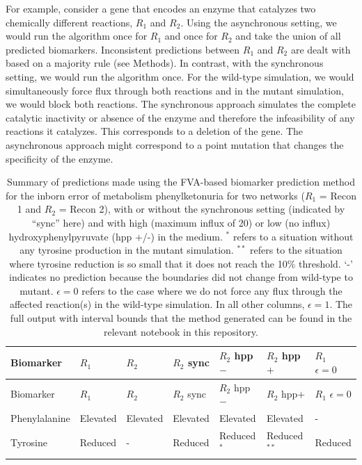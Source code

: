 \documentclass[10pt,a4paper,onecolumn]{article}
\begin{document}
For example, consider a gene that encodes an enzyme that catalyzes two
chemically different reactions, \(R_1\) and \(R_2\). Using the
asynchronous setting, we would run the algorithm once for \(R_1\) and
once for \(R_2\) and take the union of all predicted biomarkers.
Inconsistent predictions between \(R_1\) and \(R_2\) are dealt with
based on a majority rule (see Methods). In contrast, with the
synchronous setting, we would run the algorithm once. For the wild-type
simulation, we would simultaneously force flux through both reactions
and in the mutant simulation, we would block both reactions. The
synchronous approach simulates the complete catalytic inactivity or
absence of the enzyme and therefore the infeasibility of any reactions
it catalyzes. This corresponds to a deletion of the gene. The
asynchronous approach might correspond to a point mutation that changes
the specificity of the enzyme.

\hypertarget{tbl:PKU_results}{}
\begin{longtable}[]{@{}lllllll@{}}
\caption{\label{tbl:PKU_results}Summary of predictions made using the
FVA-based biomarker prediction method for the inborn error of metabolism
phenylketonuria for two networks (\(R_1\) = Recon 1 and \(R_2\) = Recon
2), with or without the synchronous setting (indicated by ``sync'' here)
and with high (maximum influx of 20) or low (no influx)
hydroxyphenylpyruvate (hpp +/-) in the medium. \(^*\) refers to a
situation without any tyrosine production in the mutant simulation.
\(^{**}\) refers to the situation where tyrosine reduction is so small
that it does not reach the 10\% threshold. `-' indicates no prediction
because the boundaries did not change from wild-type to mutant.
\(\epsilon = 0\) refers to the case where we do not force any flux
through the affected reaction(s) in the wild-type simulation. In all
other columns, \(\epsilon = 1\). The full output with interval bounds
that the method generated can be found in the relevant notebook in this
repository. }\tabularnewline
\toprule
Biomarker & \(R_1\) & \(R_2\) & \(R_2\) sync & \(R_2\) hpp\(-\) &
\(R_2\) hpp\(+\) & \(R_1\) \(\epsilon = 0\)\tabularnewline
\midrule
\endfirsthead
\toprule
Biomarker & \(R_1\) & \(R_2\) & \(R_2\) sync & \(R_2\) hpp\(-\) &
\(R_2\) hpp\(+\) & \(R_1\) \(\epsilon = 0\)\tabularnewline
\midrule
\endhead
Phenylalanine & Elevated & Elevated & Elevated & Elevated & Elevated &
-\tabularnewline
Tyrosine & Reduced & - & Reduced & Reduced\(^*\) & Reduced\(^{**}\) &
Reduced\tabularnewline
\bottomrule
\end{longtable}
\end{document}
